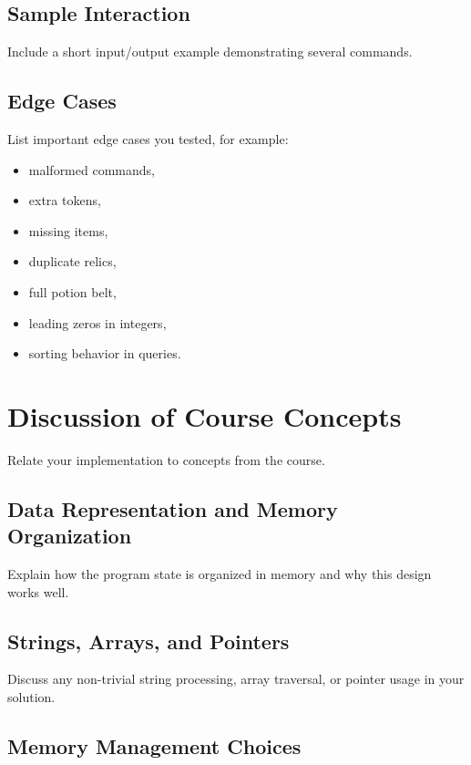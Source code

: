 \documentclass[a4paper,12pt]{article}
\begin{document}
\subsection{Sample Interaction}

Include a short input/output example demonstrating several commands.

\subsection{Edge Cases}

List important edge cases you tested, for example:

\begin{itemize}[leftmargin=1.5em]
\item malformed commands,
\item extra tokens,
\item missing items,
\item duplicate relics,
\item full potion belt,
\item leading zeros in integers,
\item sorting behavior in queries.
\end{itemize}

\section{Discussion of Course Concepts}

Relate your implementation to concepts from the course.

\subsection{Data Representation and Memory Organization}

Explain how the program state is organized in memory and why this design works well.

\subsection{Strings, Arrays, and Pointers}

Discuss any non-trivial string processing, array traversal, or pointer usage in your solution.

\subsection{Memory Management Choices}
\end{document}
